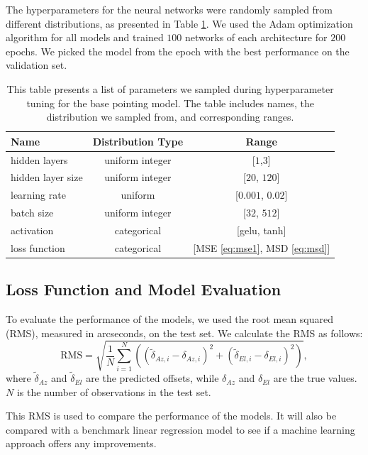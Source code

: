 The hyperparameters for the neural networks were randomly sampled from different distributions, as presented in Table \ref{tab:nn_hyperparameters}.
We used the Adam optimization algorithm for all models and trained $100$ networks of each architecture for $200$ epochs.
We picked the model from the epoch with the best performance on the validation set.
\begin{table}[H]
    \centering
    \caption[Hyperparameter search space for neural network pointing models]{This table presents a list of parameters we sampled during hyperparameter tuning for the base pointing model. The table includes names, the distribution we sampled from, and corresponding ranges.}
    \begin{tabular}{lcc}
    \hline
    \textbf{Name} & \textbf{Distribution Type} & \textbf{Range} \\ \hline
    hidden layers & uniform integer & [$1$,$3$] \\
    hidden layer size & uniform integer & [$20$, $120$] \\
    learning rate & uniform & [$0.001$, $0.02$] \\
    batch size & uniform integer & [$32$, $512$] \\
    activation & categorical & [gelu, tanh] \\
    loss function & categorical & [MSE \eqref{eq:mse1}, MSD \eqref{eq:msd}] \\ \hline
    \end{tabular}
    \label{tab:nn_hyperparameters}
    \end{table}

\subsection{Loss Function and Model Evaluation}
To evaluate the performance of the models, we used the root mean squared (RMS), measured in arcseconds, on the test set.
We calculate the RMS as follows:
\begin{equation}
    \text{RMS} = \sqrt{ \frac{1}{N} \sum_{i=1}^N \left( (\tilde{\delta}_{Az,i} - \delta_{Az,i})^2 + (\tilde{\delta}_{El,i} - \delta_{El,i})^2 \right)},
\end{equation}
where $\tilde{\delta}_{Az}$ and $\tilde{\delta}_{El}$ are the predicted offsets, while $\delta_{Az}$ and $\delta_{El}$ are the true values.
$N$ is the number of observations in the test set.

This RMS is used to compare the performance of the models.
It will also be compared with a benchmark linear regression model to see if a machine learning approach offers any improvements.